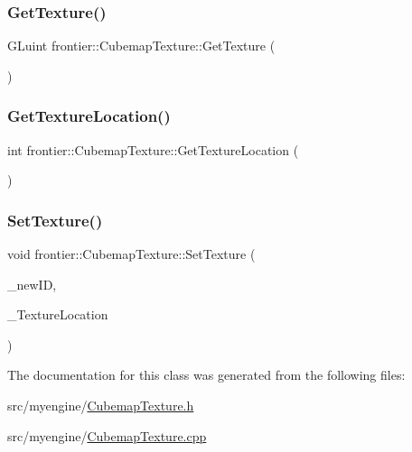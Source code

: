 \subsubsection{\texorpdfstring{Get\+Texture()}{GetTexture()}}
{\footnotesize\ttfamily G\+Luint frontier\+::\+Cubemap\+Texture\+::\+Get\+Texture (\begin{DoxyParamCaption}{ }\end{DoxyParamCaption})}

\mbox{\label{classfrontier_1_1_cubemap_texture_a091f7bd4e5233e5ce5f034ca17588387}} 
\subsubsection{\texorpdfstring{Get\+Texture\+Location()}{GetTextureLocation()}}
{\footnotesize\ttfamily int frontier\+::\+Cubemap\+Texture\+::\+Get\+Texture\+Location (\begin{DoxyParamCaption}{ }\end{DoxyParamCaption})}

\mbox{\label{classfrontier_1_1_cubemap_texture_a479becfad071909e952d728cf6a8dacb}} 
\subsubsection{\texorpdfstring{Set\+Texture()}{SetTexture()}}
{\footnotesize\ttfamily void frontier\+::\+Cubemap\+Texture\+::\+Set\+Texture (\begin{DoxyParamCaption}\item[{G\+Luint}]{\+\_\+new\+ID,  }\item[{int}]{\+\_\+\+Texture\+Location }\end{DoxyParamCaption})}



The documentation for this class was generated from the following files\+:\begin{DoxyCompactItemize}
\item 
src/myengine/\hyperlink{_cubemap_texture_8h}{Cubemap\+Texture.\+h}\item 
src/myengine/\hyperlink{_cubemap_texture_8cpp}{Cubemap\+Texture.\+cpp}\end{DoxyCompactItemize}
